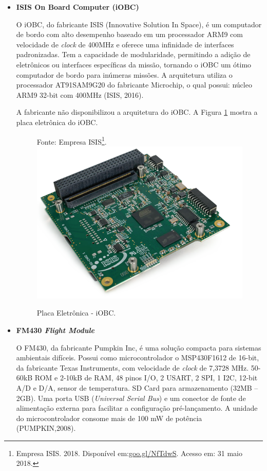 \begin{itemize}
	\item \textbf{ISIS On Board Computer (iOBC)}
	
	O iOBC, do fabricante  ISIS (Innovative Solution In Space), é um computador de bordo com alto desempenho baseado em um processador ARM9 com velocidade de \textit{clock} de 400MHz e oferece uma infinidade de interfaces padronizadas. Tem a capacidade de modularidade, permitindo a adição de eletrônicos ou interfaces específicas da missão, tornando o iOBC um ótimo computador de bordo para inúmeras missões.	A arquitetura utiliza o processador AT91SAM9G20 do fabricante Microchip, o qual possui: núcleo ARM9 32-bit com 400MHz (ISIS, 2016).
	
	A fabricante não disponibilizou a arquitetura do iOBC. A Figura \ref{fig14} mostra a placa eletrônica do iOBC. 
	
	\begin{figure}[h]
	\footnotesize{
		\centering
		Fonte: Empresa ISIS\footnote{Empresa ISIS. 2018. Disponível em:\url{goo.gl/NfTdwS}. Acesso em: 31 maio 2018.}. \linebreak
		\includegraphics[keepaspectratio=true,scale=0.44]{figuras/isis.PNG}
		\caption{Placa Eletrônica - iOBC.}
		\label{fig14}
	}
	\end{figure}
	\FloatBarrier
	
	\newpage
	\item \textbf{FM430 \textit{Flight Module}}
	
	O FM430, da fabricante Pumpkin Inc, é uma solução compacta para sistemas ambientais difíceis. Possui como microcontrolador o MSP430F1612 de 16-bit, da fabricante Texas Instruments, com velocidade de \textit{clock} de 7,3728 MHz. 50-60kB ROM e 2-10kB de RAM, 48 pinos I/O, 2 USART, 2 SPI, 1 I2C, 12-bit A/D e D/A, sensor de temperatura. SD Card para armazenamento (32MB – 2GB). Uma porta USB (\textit{Universal Serial Bus}) e um conector de fonte de alimentação externa para facilitar a configuração pré-lançamento. A unidade do microcontrolador consome mais de 100 mW de potência (PUMPKIN,2008).
	

\end{itemize}
